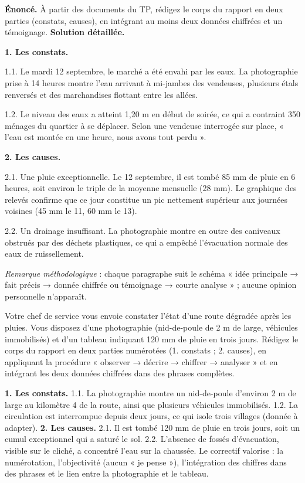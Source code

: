 \documentclass[11pt]{article}
\begin{document}
\begin{exoresolu}
\textbf{Énoncé.} À partir des documents du TP, rédigez le corps du rapport en deux parties (constats, causes), en intégrant au moins deux données chiffrées et un témoignage.
\tcblower
\textbf{Solution détaillée.}

\textbf{1. Les constats.}

1.1. Le mardi 12 septembre, le marché a été envahi par les eaux. La photographie prise à 14 heures montre l'eau arrivant à mi-jambes des vendeuses, plusieurs étals renversés et des marchandises flottant entre les allées.

1.2. Le niveau des eaux a atteint 1,20 m en début de soirée, ce qui a contraint 350 ménages du quartier à se déplacer. Selon une vendeuse interrogée sur place, « l'eau est montée en une heure, nous avons tout perdu ».

\textbf{2. Les causes.}

2.1. Une pluie exceptionnelle. Le 12 septembre, il est tombé 85 mm de pluie en 6 heures, soit environ le triple de la moyenne mensuelle (28 mm). Le graphique des relevés confirme que ce jour constitue un pic nettement supérieur aux journées voisines (45 mm le 11, 60 mm le 13).

2.2. Un drainage insuffisant. La photographie montre en outre des caniveaux obstrués par des déchets plastiques, ce qui a empêché l'évacuation normale des eaux de ruissellement.

\emph{Remarque méthodologique} : chaque paragraphe suit le schéma « idée principale → fait précis → donnée chiffrée ou témoignage → courte analyse » ; aucune opinion personnelle n'apparaît.
\end{exoresolu}

\begin{exercice}
Votre chef de service vous envoie constater l'état d'une route dégradée après les pluies. Vous disposez d'une photographie (nid-de-poule de 2 m de large, véhicules immobilisés) et d'un tableau indiquant 120 mm de pluie en trois jours. Rédigez le corps du rapport en deux parties numérotées (1. constats ; 2. causes), en appliquant la procédure « observer → décrire → chiffrer → analyser » et en intégrant les deux données chiffrées dans des phrases complètes.
\end{exercice}

\begin{corrige}
\textbf{1. Les constats.} 1.1. La photographie montre un nid-de-poule d'environ 2 m de large au kilomètre 4 de la route, ainsi que plusieurs véhicules immobilisés. 1.2. La circulation est interrompue depuis deux jours, ce qui isole trois villages (donnée à adapter). \textbf{2. Les causes.} 2.1. Il est tombé 120 mm de pluie en trois jours, soit un cumul exceptionnel qui a saturé le sol. 2.2. L'absence de fossés d'évacuation, visible sur le cliché, a concentré l'eau sur la chaussée. Le correctif valorise : la numérotation, l'objectivité (aucun « je pense »), l'intégration des chiffres dans des phrases et le lien entre la photographie et le tableau.
\end{corrige}
\end{document}
